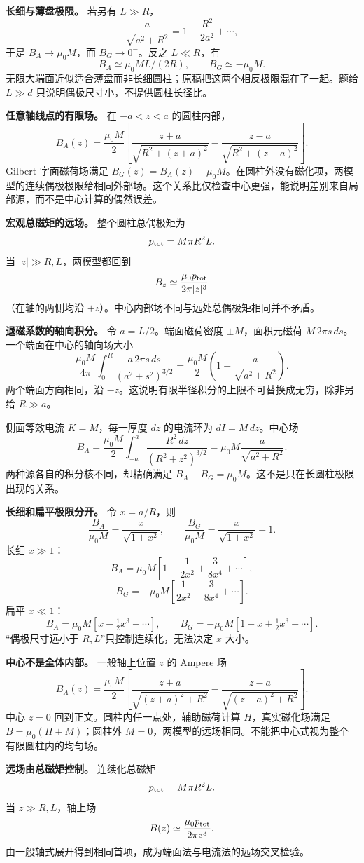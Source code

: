 \documentclass[12pt,a4paper,UTF8]{ctexart}
\begin{document}
\textbf{长细与薄盘极限。} 若另有 \(L\gg R\)， \[
\frac a{\sqrt{a^2+R^2}}
=1-\frac{R^2}{2a^2}+\cdots,
\] 于是 \(B_A\to\mu_0M\)，而 \(B_G\to0^-\)。反之 \(L\ll R\)，有 \[
B_A\simeq\mu_0M L/(2R),\qquad
B_G\simeq-\mu_0M.
\]
无限大端面近似适合薄盘而非长细圆柱；原稿把这两个相反极限混在了一起。题给
\(L\gg d\) 只说明偶极尺寸小，不提供圆柱长径比。

\textbf{任意轴线点的有限场。} 在 \(-a<z<a\) 的圆柱内部， \[
B_A(z)=\frac{\mu_0M}{2}
\left[
\frac{z+a}{\sqrt{R^2+(z+a)^2}}
-\frac{z-a}{\sqrt{R^2+(z-a)^2}}
\right].
\] Gilbert 字面磁荷场满足
\(B_G(z)=B_A(z)-\mu_0M\)。在圆柱外没有磁化项，两模型的连续偶极极限给相同外部场。这个关系比仅检查中心更强，能说明差别来自局部源，而不是中心计算的偶然误差。

\textbf{宏观总磁矩的远场。} 整个圆柱总偶极矩为 \[
p_{\rm tot}=M\pi R^2L.
\] 当 \(|z|\gg R,L\)，两模型都回到 \[
B_z\simeq\frac{\mu_0p_{\rm tot}}{2\pi|z|^3}
\] （在轴的两侧均沿 \(+z\)）。中心内部场不同与远处总偶极矩相同并不矛盾。

\textbf{退磁系数的轴向积分。} 令 \(a=L/2\)。端面磁荷密度
\(\pm M\)，面积元磁荷 \(M\,2\pi s\,ds\)。一个端面在中心的轴向场大小 \[
\frac{\mu_0M}{4\pi}\int_0^R
\frac{a\,2\pi s\,ds}{(a^2+s^2)^{3/2}}
=\frac{\mu_0M}{2}\left(1-\frac a{\sqrt{a^2+R^2}}\right).
\] 两个端面方向相同，沿
\(-z\)。这说明有限半径积分的上限不可替换成无穷，除非另给 \(R\gg a\)。

侧面等效电流 \(K=M\)，每一厚度 \(dz\) 的电流环为 \(dI=M\,dz\)。中心场 \[
B_A=\frac{\mu_0M}{2}\int_{-a}^{a}
\frac{R^2\,dz}{(R^2+z^2)^{3/2}}
=\mu_0M\frac a{\sqrt{a^2+R^2}}.
\] 两种源各自的积分核不同，却精确满足
\(B_A-B_G=\mu_0M\)。这不是只在长圆柱极限出现的关系。

\textbf{长细和扁平极限分开。} 令 \(x=a/R\)，则 \[
\frac{B_A}{\mu_0M}=\frac{x}{\sqrt{1+x^2}},
\qquad \frac{B_G}{\mu_0M}=\frac{x}{\sqrt{1+x^2}}-1.
\] 长细 \(x\gg1\)： \[
B_A=\mu_0M\left[1-\frac1{2x^2}+\frac3{8x^4}+\cdots\right],
\] \[
B_G=-\mu_0M\left[\frac1{2x^2}-\frac3{8x^4}+\cdots\right].
\] 扁平 \(x\ll1\)： \[
B_A=\mu_0M[x-\tfrac12x^3+\cdots],\qquad
B_G=-\mu_0M[1-x+\tfrac12x^3+\cdots].
\] ``偶极尺寸远小于 \(R,L\)''只控制连续化，无法决定 \(x\) 大小。

\textbf{中心不是全体内部。} 一般轴上位置 \(z\) 的 Ampere 场 \[
B_A(z)=\frac{\mu_0M}{2}
\left[\frac{z+a}{\sqrt{(z+a)^2+R^2}}
-\frac{z-a}{\sqrt{(z-a)^2+R^2}}\right].
\] 中心 \(z=0\) 回到正文。圆柱内任一点处，辅助磁荷计算
\(H\)，真实磁化场满足 \(B=\mu_0(H+M)\)；圆柱外
\(M=0\)，两模型的远场相同。不能把中心式视为整个有限圆柱内的均匀场。

\textbf{远场由总磁矩控制。} 连续化总磁矩 \[
p_{\rm tot}=M\pi R^2L.
\] 当 \(z\gg R,L\)，轴上场 \[
B(z)\simeq\frac{\mu_0p_{\rm tot}}{2\pi z^3}.
\] 由一般轴式展开得到相同首项，成为端面法与电流法的远场交叉检验。
\end{document}
